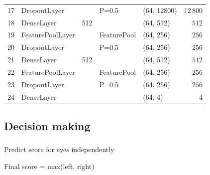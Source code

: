 \begin{frame}
\begin{table}[]
\begin{tabular}{@{}clcllr@{}}
17 & DropoutLayer              &      & P=0.5       & (64, 12800)         & $12\,800$   \\
18 & DenseLayer                & 512  &             & (64, 512)           & $512$     \\
19 & FeaturePoolLayer          &      & FeaturePool & (64, 256)           & $256$     \\
20 & DropoutLayer              &      & P=0.5       & (64, 256)           & $256$     \\
21 & DenseLayer                & 512  &             & (64, 512)           & $512$     \\
22 & FeaturePoolLayer          &      & FeaturePool & (64, 256)           & $256$     \\
23 & DropoutLayer              &      & P=0.5       & (64, 256)           & $256$     \\
24 & DenseLayer                &      &             & (64, 4)             & $4$       \\ \bottomrule
\end{tabular}
\end{table}

\end{frame}


\subsection{Decision making}

\begin{frame}\frametitle{}
\par Predict score for eyes independently
\par Final score = max(left, right)
\end{frame}


